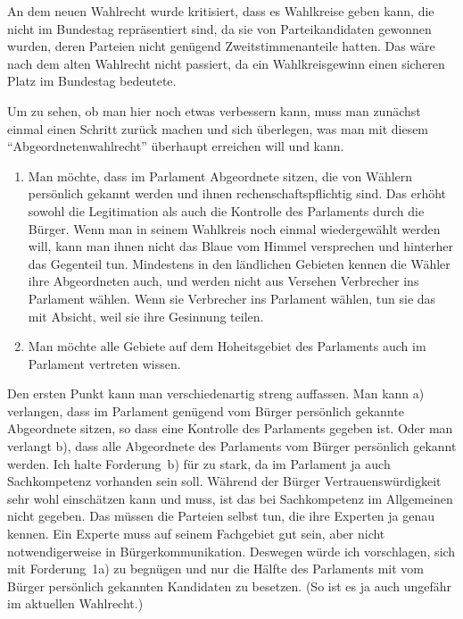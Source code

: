 An dem neuen Wahlrecht wurde kritisiert, dass es Wahlkreise geben kann, die nicht im Bundestag
repräsentiert sind, da sie von Parteikandidaten gewonnen wurden, deren Parteien nicht genügend
Zweitstimmenanteile hatten. Das wäre nach dem alten Wahlrecht nicht passiert, da ein
Wahlkreisgewinn einen sicheren Platz im Bundestag bedeutete.

Um zu sehen, ob man hier noch etwas verbessern kann, muss man zunächst einmal einen Schritt
zurück machen und sich überlegen, was man mit diesem \enquote{Abgeordnetenwahlrecht} überhaupt
erreichen will und kann.

\begin{enumerate}
  \item Man möchte, dass im Parlament Abgeordnete sitzen, die von Wählern persönlich gekannt
    werden und ihnen rechenschaftspflichtig sind. Das erhöht sowohl die Legitimation als auch die
    Kontrolle des Parlaments durch die Bürger. Wenn man in seinem Wahlkreis noch einmal
    wiedergewählt werden will, kann man ihnen nicht das Blaue vom Himmel versprechen und hinterher
    das Gegenteil tun. Mindestens in den ländlichen Gebieten kennen die Wähler ihre Abgeordneten
    auch, und werden nicht aus Versehen Verbrecher ins Parlament wählen. Wenn sie Verbrecher ins
    Parlament wählen, tun sie das mit Absicht, weil sie ihre Gesinnung teilen.

  \item Man möchte alle Gebiete auf dem Hoheitsgebiet des Parlaments auch im Parlament vertreten
    wissen.
\end{enumerate}

Den ersten Punkt kann man verschiedenartig streng auffassen. Man kann a) verlangen, dass im
Parlament genügend vom Bürger persönlich gekannte Abgeordnete sitzen, so dass eine Kontrolle des
Parlaments gegeben ist. Oder man verlangt b), dass alle Abgeordnete des Parlaments vom Bürger
persönlich gekannt werden. Ich halte Forderung~b) für zu stark, da im Parlament ja auch
Sachkompetenz vorhanden sein soll. Während der Bürger Vertrauenswürdigkeit sehr wohl einschätzen
kann und muss, ist das bei Sachkompetenz im Allgemeinen nicht gegeben. Das müssen die Parteien
selbst tun, die ihre Experten ja genau kennen. Ein Experte muss auf seinem Fachgebiet gut sein,
aber nicht notwendigerweise in Bürgerkommunikation. Deswegen würde ich vorschlagen, sich mit
Forderung~1a) zu begnügen und nur die Hälfte des Parlaments mit vom Bürger persönlich gekannten
Kandidaten zu besetzen. (So ist es ja auch ungefähr im aktuellen Wahlrecht.)

